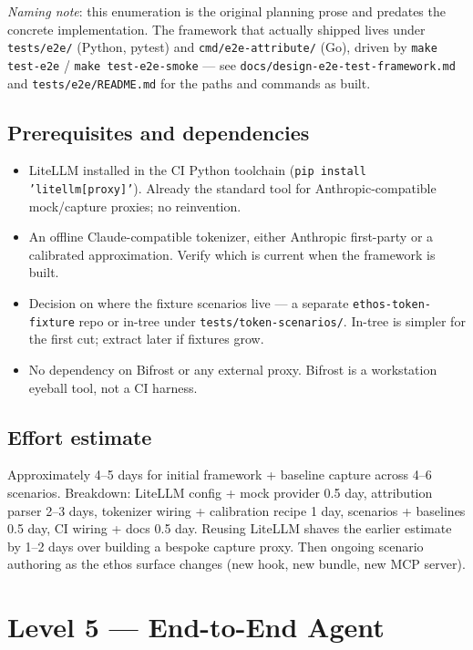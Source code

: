 \documentclass[a4paper,10pt]{article}
\newcommand{\cmd}[1]{\texttt{#1}}
\newcommand{\fpath}[1]{\texttt{#1}}
\begin{document}
\emph{Naming note}: this enumeration is the original planning
prose and predates the concrete implementation.  The framework that
actually shipped lives under \fpath{tests/e2e/} (Python, pytest) and
\fpath{cmd/e2e-attribute/} (Go), driven by \cmd{make test-e2e} /
\cmd{make test-e2e-smoke} --- see
\fpath{docs/design-e2e-test-framework.md} and
\fpath{tests/e2e/README.md} for the paths and commands as built.

\subsection*{Prerequisites and dependencies}

\begin{itemize}
  \item LiteLLM installed in the CI Python toolchain
    (\cmd{pip install 'litellm[proxy]'}).  Already the standard
    tool for Anthropic-compatible mock/capture proxies; no
    reinvention.
  \item An offline Claude-compatible tokenizer, either Anthropic
    first-party or a calibrated approximation.  Verify which is
    current when the framework is built.
  \item Decision on where the fixture scenarios live --- a separate
    \texttt{ethos-token-fixture} repo or in-tree under
    \fpath{tests/token-scenarios/}.  In-tree is simpler for the
    first cut; extract later if fixtures grow.
  \item No dependency on Bifrost or any external proxy.  Bifrost is
    a workstation eyeball tool, not a CI harness.
\end{itemize}

\subsection*{Effort estimate}

Approximately 4--5 days for initial framework + baseline capture
across 4--6 scenarios.  Breakdown: LiteLLM config + mock provider
0.5 day, attribution parser 2--3 days, tokenizer wiring +
calibration recipe 1 day, scenarios + baselines 0.5 day, CI wiring
+ docs 0.5 day.  Reusing LiteLLM shaves the earlier estimate by
1--2 days over building a bespoke capture proxy.  Then ongoing
scenario authoring as the ethos surface changes (new hook, new
bundle, new MCP server).

\section{Level 5 --- End-to-End Agent}
\end{document}
